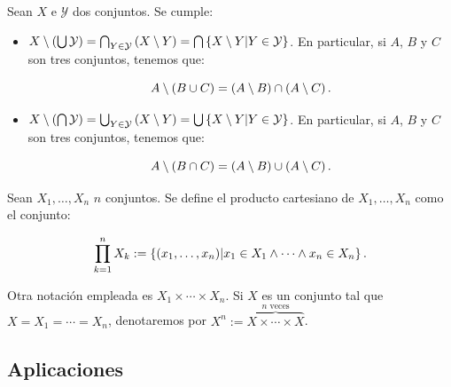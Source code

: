 \begin{theorem}
  \rm Sean $X$ e $\mathcal{Y}$ dos conjuntos. Se cumple:

  \begin{itemize}
      \item[1.] $X\setminus\left(\bigcup{\mathcal{Y}}\right)=\bigcap_{Y\in\mathcal{Y}}{\left(X\setminus Y\right)}=\bigcap{\left\{X\setminus Y\middle|Y\in\mathcal{Y}\right\}}$. En particular, si $A$, $B$ y $C$ son tres conjuntos, tenemos que:
      
      \begin{equation}
          A\setminus\left(B\cup C\right)=\left(A\setminus B\right)\cap\left(A\setminus C\right).
      \end{equation}
      \item[2.] $X\setminus\left(\bigcap{\mathcal{Y}}\right)=\bigcup_{Y\in\mathcal{Y}}{\left(X\setminus Y\right)}=\bigcup{\left\{X\setminus Y\middle|Y\in\mathcal{Y}\right\}}$. En particular, si $A$, $B$ y $C$ son tres conjuntos, tenemos que:

      \begin{equation}
          A\setminus\left(B\cap C\right)=\left(A\setminus B\right)\cup\left(A\setminus C\right).
      \end{equation}
  \end{itemize}
\end{theorem}

\begin{definition}
  \rm Sean $X_1,\dots,X_n$ $n$ conjuntos. Se define el producto cartesiano de $X_1,\dots,X_n$ como el conjunto:

  \begin{equation}
    \prod_{k=1}^{n}{X_k}:=\left\{\left(x_1,\dots,x_n\right)\middle|x_1\in X_1\land\dots\land x_n\in X_n\right\}.
  \end{equation}

  Otra notación empleada es $X_1\times\cdots\times X_n$. Si $X$ es un conjunto tal que $X=X_1=\cdots=X_n$, denotaremos por $X^n:=\overbrace{X\times\cdots\times X}^{n\text{ veces}}$.
\end{definition}

\subsection{Aplicaciones}

